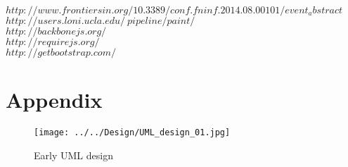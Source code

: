 \documentclass[a4paper,11pt,titlepage]{article}
\begin{document}
$http://www.frontiersin.org/10.3389/conf.fninf.2014.08.00101/event_abstract$\\
$http://users.loni.ucla.edu/~pipeline/paint/$\\
$http://backbonejs.org/$\\
$http://requirejs.org/$\\
$http://getbootstrap.com/$\\

\section{Appendix}


\begin{figure}[ht!]
\centering
\texttt{[image: ../../Design/UML\_design\_01.jpg]}
\caption{Early UML design}
\label{fig:UIdesign1}
\end{figure}


\begin{figure}[ht]
\end{figure}
\end{document}
